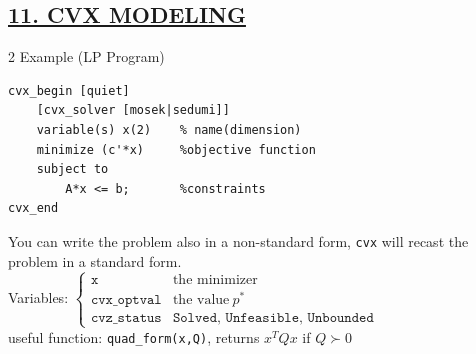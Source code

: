 \documentclass[a4paper]{article}
\begin{document}
\subsection*{\color{cyan}
\textsf{
    \underline{11. CVX MODELING}}}
\begin{multicols}{2}
    \noindent
Example (LP Program)
\begin{verbatim}
cvx_begin [quiet]
    [cvx_solver [mosek|sedumi]]        
    variable(s) x(2)    % name(dimension)
    minimize (c'*x)     %objective function
    subject to             
        A*x <= b;       %constraints
cvx_end 
\end{verbatim}
    \newcolumn
    You can write the problem also in a non-standard form, \texttt{cvx} will recast the problem in a standard form. \\
    Variables: $\begin{cases}
        \texttt{x}&\text{the minimizer}\\
        \texttt{cvx\_optval}&\text{the value} \ p^*\\
        \texttt{cvz\_status}&\texttt{Solved, Unfeasible, Unbounded}
    \end{cases}$\\

    \noindent
    useful function: \texttt{quad\_form(x,Q)}, returns $x^T{Q}x$ if $Q\succ0$
\end{multicols}
\end{document}
